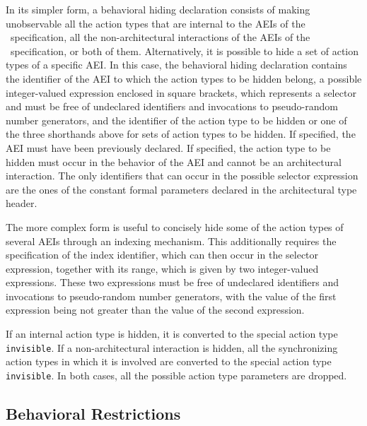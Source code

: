 In its simpler form, a behavioral hiding declaration consists of making unobservable all the action types
that are internal to the AEIs of the \aemilia\ specification, all the non-architectural interactions of the
AEIs of the \aemilia\ specification, or both of them. Alternatively, it is possible to hide a set of action
types of a specific AEI. In this case, the behavioral hiding declaration contains the identifier of the AEI
to which the action types to be hidden belong, a possible integer-valued expression enclosed in square
brackets, which represents a selector and must be free of undeclared identifiers and invocations to
pseudo-random number generators, and the identifier of the action type to be hidden or one of the three
shorthands above for sets of action types to be hidden. If specified, the AEI must have been previously
declared. If specified, the action type to be hidden must occur in the behavior of the AEI and cannot be an
architectural interaction. The only identifiers that can occur in the possible selector expression are the
ones of the constant formal parameters declared in the architectural type header.

The more complex form is useful to concisely hide some of the action types of several AEIs through an
indexing mechanism. This additionally requires the specification of the index identifier, which can then
occur in the selector expression, together with its range, which is given by two integer-valued expressions.
These two expressions must be free of undeclared identifiers and invocations to pseudo-random number
generators, with the value of the first expression being not greater than the value of the second
expression.

If an internal action type is hidden, it is converted to the special action type {\tt invisible}. If a
non-architectural interaction is hidden, all the synchronizing action types in which it is involved are
converted to the special action type {\tt invisible}. In both cases, all the possible action type parameters
are dropped.


\subsection{Behavioral Restrictions}


